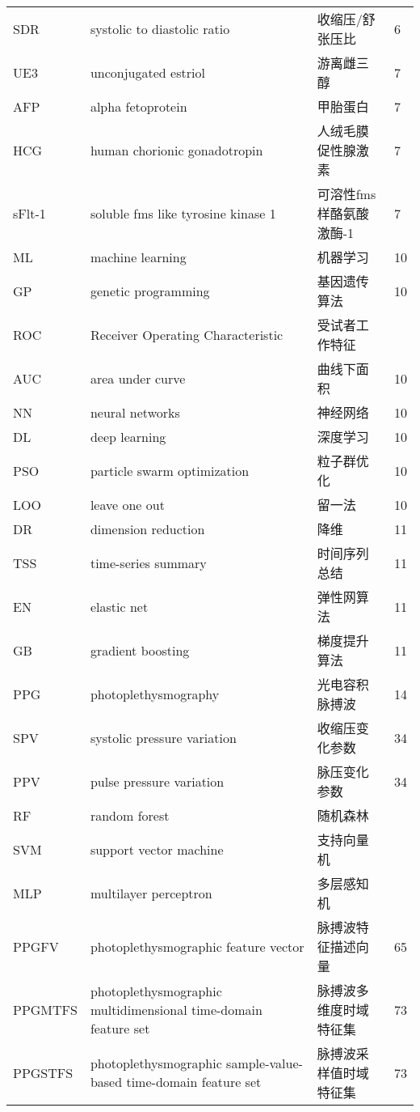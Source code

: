 \begin{center}
\begin{longtable}{m{2cm}m{7cm}m{5cm}m{1cm}<{\centering}}
        SDR     &  systolic to diastolic ratio & 收缩压/舒张压比 & 6\\
        UE3     & unconjugated estriol & 游离雌三醇 & 7\\
        AFP     & alpha fetoprotein     & 甲胎蛋白 & 7 \\
        HCG     & human chorionic gonadotropin  & 人绒毛膜促性腺激素    & 7 \\
        sFlt-1  & soluble fms like tyrosine kinase 1    & 可溶性fms样酪氨酸激酶-1 & 7\\
        ML     & machine learning  & 机器学习  & 10    \\
        GP  & genetic programming   & 基因遗传算法  &10 \\
        ROC & Receiver Operating Characteristic & 受试者工作特征 \\
        AUC & area under curve & 曲线下面积 & 10 \\
        NN & neural networks & 神经网络 & 10 \\
        DL & deep learning & 深度学习 & 10 \\
        PSO & particle swarm optimization & 粒子群优化 & 10 \\
        LOO & leave one out & 留一法 & 10 \\
        DR  & dimension reduction & 降维 & 11 \\
        TSS & time-series summary & 时间序列总结 & 11 \\
        EN & elastic net  & 弹性网算法 & 11 \\
        GB &  gradient boosting  & 梯度提升算法 & 11 \\
        PPG & photoplethysmography & 光电容积脉搏波 & 14 \\


        SPV & systolic pressure variation & 收缩压变化参数 & 34 \\
        PPV & pulse pressure variation & 脉压变化参数 & 34 \\



        
        RF&random forest&随机森林\\
        SVM&support vector machine&支持向量机\\
        MLP&multilayer perceptron&多层感知机\\
        PPGFV &photoplethysmographic feature vector&  脉搏波特征描述向量 & 65\\
        PPGMTFS &     photoplethysmographic multidimensional time-domain feature set & 脉搏波多维度时域特征集 & 73 \\
        PPGSTFS &     photoplethysmographic sample-value-based time-domain feature set & 脉搏波采样值时域特征集 & 73 \\
        

\end{longtable}
\end{center}
